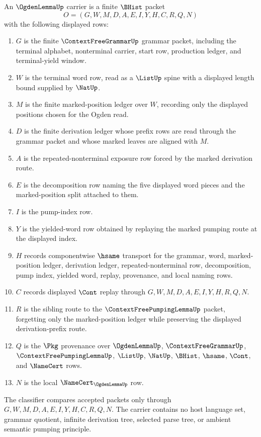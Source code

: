 \begin{definition}
\label{def:ogden-lemma-carrier}
An $\OgdenLemmaUp$ carrier is a finite $\BHist$ packet
$$
O=(G,W,M,D,A,E,I,Y,H,C,R,Q,N)
$$
with the following displayed rows:
\begin{enumerate}
\item $G$ is the finite $\ContextFreeGrammarUp$ grammar packet, including the
terminal alphabet, nonterminal carrier, start row, production ledger, and
terminal-yield window.
\item $W$ is the terminal word row, read as a $\ListUp$ spine with a displayed
length bound supplied by $\NatUp$.
\item $M$ is the finite marked-position ledger over $W$, recording only the
displayed positions chosen for the Ogden read.
\item $D$ is the finite derivation ledger whose prefix rows are read through
the grammar packet and whose marked leaves are aligned with $M$.
\item $A$ is the repeated-nonterminal exposure row forced by the marked
derivation route.
\item $E$ is the decomposition row naming the five displayed word pieces and
the marked-position split attached to them.
\item $I$ is the pump-index row.
\item $Y$ is the yielded-word row obtained by replaying the marked pumping
route at the displayed index.
\item $H$ records componentwise $\hsame$ transport for the grammar, word,
marked-position ledger, derivation ledger, repeated-nonterminal row,
decomposition, pump index, yielded word, replay, provenance, and local naming
rows.
\item $C$ records displayed $\Cont$ replay through
$G,W,M,D,A,E,I,Y,H,R,Q,N$.
\item $R$ is the sibling route to the $\ContextFreePumpingLemmaUp$ packet,
forgetting only the marked-position ledger while preserving the displayed
derivation-prefix route.
\item $Q$ is the $\Pkg$ provenance over $\OgdenLemmaUp$,
$\ContextFreeGrammarUp$, $\ContextFreePumpingLemmaUp$, $\ListUp$, $\NatUp$,
$\BHist$, $\hsame$, $\Cont$, and $\NameCert$ rows.
\item $N$ is the local $\NameCert_{\OgdenLemmaUp}$ row.
\end{enumerate}
The classifier compares accepted packets only through
$G,W,M,D,A,E,I,Y,H,C,R,Q,N$. The carrier contains no host language set,
grammar quotient, infinite derivation tree, selected parse tree, or ambient
semantic pumping principle.
\end{definition}

